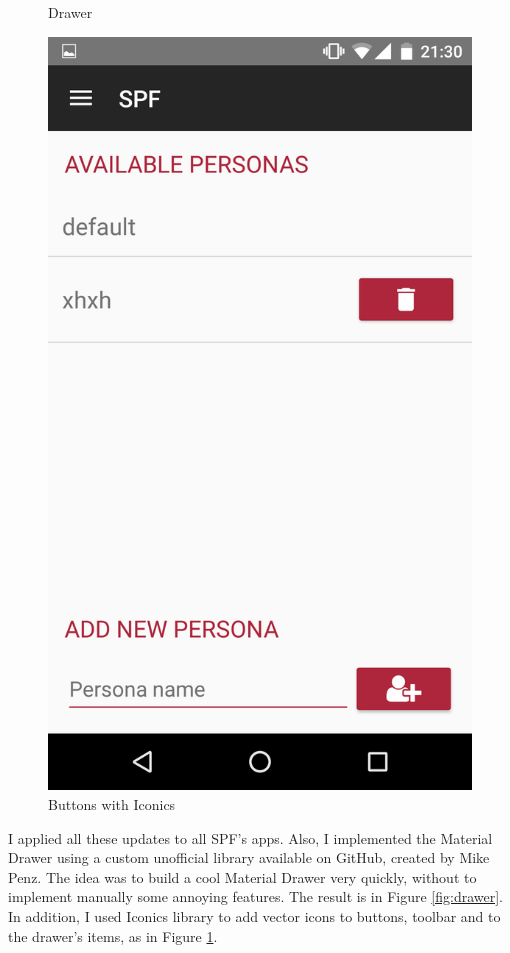 \begin{figure}[thpb]
\begin{minipage}[b]{0.4\textwidth}
	\caption{Drawer}
	\label{fig:drawer}
\end{minipage}
\hfill
\begin{minipage}[b]{0.4\textwidth}
	\centering
	\includegraphics[scale=0.1]{./images/chap3/bottom_iconics.png}
	\caption{Buttons with Iconics}
	\label{fig:buttom-iconics}
\end{minipage}	
\end{figure}	

I applied all these updates to all SPF's apps. Also, I implemented the \textsf{Material Drawer} using a custom unofficial library available on GitHub, created by Mike Penz. The idea was to build a cool Material Drawer very quickly, without to implement manually some annoying features. The result is in Figure \ref{fig:drawer}. In addition, I used \textsf{Iconics} library to add vector icons to buttons, toolbar and to the drawer's items, as in Figure \ref{fig:buttom-iconics}.

